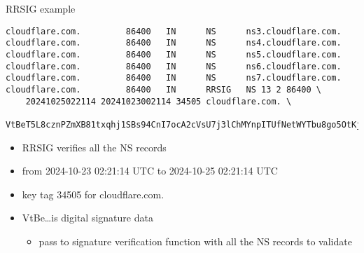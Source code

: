 \begin{frame}[fragile]{RRSIG example}
\begin{Verbatim}[fontsize=\fontsize{9}{10}]
cloudflare.com.         86400   IN      NS      ns3.cloudflare.com.
cloudflare.com.         86400   IN      NS      ns4.cloudflare.com.                 
cloudflare.com.         86400   IN      NS      ns5.cloudflare.com.
cloudflare.com.         86400   IN      NS      ns6.cloudflare.com.                    
cloudflare.com.         86400   IN      NS      ns7.cloudflare.com.
cloudflare.com.         86400   IN      RRSIG   NS 13 2 86400 \
    20241025022114 20241023002114 34505 cloudflare.com. \
    VtBeT5L8cznPZmXB81txqhj1SBs94CnI7ocA2cVsU7j3lChMYnpITUfNetWYTbu8go5OtKjL5HZG7r+90t051A==
\end{Verbatim}
\begin{itemize}
\item RRSIG verifies all the NS records
\item from 2024-10-23 02:21:14 UTC to 2024-10-25 02:21:14 UTC 
\item key tag 34505 for cloudflare.com.
\item VtBe\ldots is digital signature data
    \begin{itemize}
    \item pass to signature verification function with all the NS records to validate
    \end{itemize}
\end{itemize}
\end{frame}
